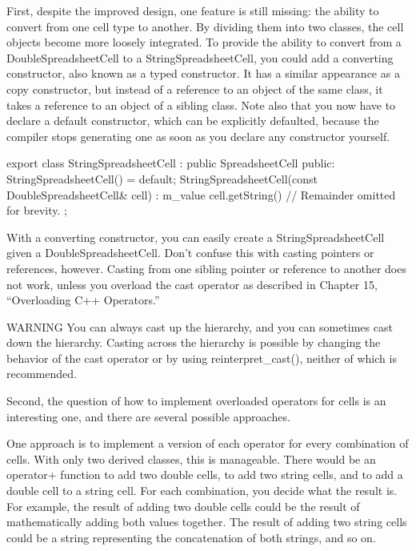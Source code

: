 First, despite the improved design, one feature is still missing: the ability to convert from one cell type to another. By dividing them into two classes, the cell objects become more loosely integrated. To provide the ability to convert from a DoubleSpreadsheetCell to a StringSpreadsheetCell, you could add a converting constructor, also known as a typed constructor. It has a similar appearance as a copy constructor, but instead of a reference to an object of the same class, it takes a reference to an object of a sibling class. Note also that you now have to declare a default constructor, which can be explicitly defaulted, because the compiler stops generating one as soon as you declare any constructor yourself.

\begin{cpp}
export class StringSpreadsheetCell : public SpreadsheetCell
{
    public:
        StringSpreadsheetCell() = default;
        StringSpreadsheetCell(const DoubleSpreadsheetCell& cell)
            : m_value { cell.getString() }
        { }
        // Remainder omitted for brevity.
};
\end{cpp}

With a converting constructor, you can easily create a StringSpreadsheetCell given a DoubleSpreadsheetCell. Don’t confuse this with casting pointers or references, however. Casting from one sibling pointer or reference to another does not work, unless you overload the cast operator as described in Chapter 15, “Overloading C++ Operators.”

\begin{myWarning}{WARNING}
You can always cast up the hierarchy, and you can sometimes cast down the hierarchy. Casting across the hierarchy is possible by changing the behavior of the cast operator or by using reinterpret\_cast(), neither of which is recommended.
\end{myWarning}

Second, the question of how to implement overloaded operators for cells is an interesting one, and there are several possible approaches.

One approach is to implement a version of each operator for every combination of cells. With only two derived classes, this is manageable. There would be an operator+ function to add two double cells, to add two string cells, and to add a double cell to a string cell. For each combination, you decide what the result is. For example, the result of adding two double cells could be the result of mathematically adding both values together. The result of adding two string cells could be a string representing the concatenation of both strings, and so on.

